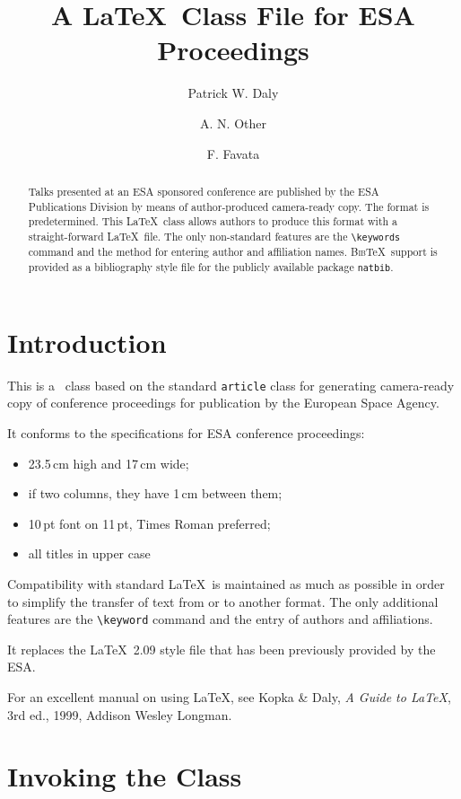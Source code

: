 \documentclass[a4paper,twocolumn]{esapub2005} %
\title{A \LaTeX\ Class File for ESA Proceedings}
\author{Patrick W. Daly}
\author{A. N. Other}
\affil{Max-Planck-Institut f\"ur Aeronomie, 37191 Katlenburg-Lindau, Germany}
\author{F. Favata}
\affil{Astrophysics Division, ESTEC, 2200 AG Noordwijk, The Netherlands}
\newcommand{\btx}{\textsc{Bib}\TeX}
\begin{document}

\maketitle

\begin{abstract}
Talks presented at an ESA sponsored conference are published by the ESA
Publications Division by means of author-produced camera-ready copy. The
format is predetermined. This \LaTeX\ class allows authors to produce
this format with a straight-forward \LaTeX\ file. The only non-standard
features are the \verb!\keywords! command and the method for entering
author and affiliation names. \btx\ support is provided as a bibliography
style file for the publicly available package \texttt{natbib}.
\end{abstract}

\section{Introduction}

This is a \LaTeXe\ class based on the standard \texttt{article} class for
generating camera-ready copy of conference proceedings for publication by
the European Space Agency.

It conforms to the specifications for ESA conference proceedings:
\begin{itemize}
\item 23.5\,cm high and 17\,cm wide;
\item if two columns, they have 1\,cm between them;
\item 10\,pt font on 11\,pt, Times Roman preferred;
\item all titles in upper case
\end{itemize}

Compatibility with standard \LaTeX\ is maintained as much as possible in
order to simplify the transfer of text from or to another format. The
only additional features are the \verb!\keyword! command and the entry of
authors and affiliations.

It replaces the \LaTeX~2.09 style file that has been previously provided
by the ESA.

For an excellent manual on using \LaTeX, see Kopka \& Daly, \emph{A Guide
to \LaTeX}, 3rd ed., 1999, Addison Wesley Longman.

\section{Invoking the Class}
\end{document}
